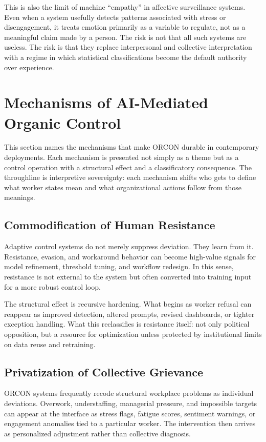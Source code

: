 \documentclass[runningheads]{llncs}
\begin{document}
This is also the limit of machine ``empathy'' in affective surveillance systems. Even when a system usefully detects patterns associated with stress or disengagement, it treats emotion primarily as a variable to regulate, not as a meaningful claim made by a person. The risk is not that all such systems are useless. The risk is that they replace interpersonal and collective interpretation with a regime in which statistical classifications become the default authority over experience.

\section{Mechanisms of AI-Mediated Organic Control}

This section names the mechanisms that make ORCON durable in contemporary deployments. Each mechanism is presented not simply as a theme but as a control operation with a structural effect and a classificatory consequence. The throughline is interpretive sovereignty: each mechanism shifts who gets to define what worker states mean and what organizational actions follow from those meanings.

\subsection{Commodification of Human Resistance}

Adaptive control systems do not merely suppress deviation. They learn from it. Resistance, evasion, and workaround behavior can become high-value signals for model refinement, threshold tuning, and workflow redesign. In this sense, resistance is not external to the system but often converted into training input for a more robust control loop.

The structural effect is recursive hardening. What begins as worker refusal can reappear as improved detection, altered prompts, revised dashboards, or tighter exception handling. What this reclassifies is resistance itself: not only political opposition, but a resource for optimization unless protected by institutional limits on data reuse and retraining.

\subsection{Privatization of Collective Grievance}

ORCON systems frequently recode structural workplace problems as individual deviations. Overwork, understaffing, managerial pressure, and impossible targets can appear at the interface as stress flags, fatigue scores, sentiment warnings, or engagement anomalies tied to a particular worker. The intervention then arrives as personalized adjustment rather than collective diagnosis.
\end{document}
